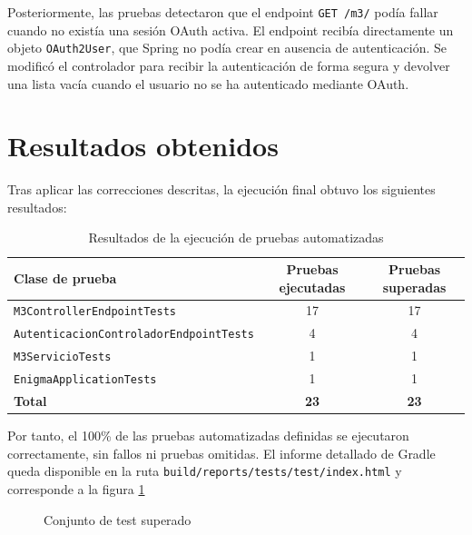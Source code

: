 Posteriormente, las pruebas detectaron que el endpoint \texttt{GET /m3/} podía fallar cuando no existía una sesión OAuth activa. El endpoint recibía directamente un objeto \texttt{OAuth2User}, que Spring no podía crear en ausencia de autenticación. Se modificó el controlador para recibir la autenticación de forma segura y devolver una lista vacía cuando el usuario no se ha autenticado mediante OAuth.

\section{Resultados obtenidos}

Tras aplicar las correcciones descritas, la ejecución final obtuvo los siguientes resultados:

\begin{table}[htbp]
	\centering
	\hspace*{-2cm}
	\begin{tabular}{|l|c|c|}
		\hline
		\textbf{Clase de prueba} & \textbf{Pruebas ejecutadas} & \textbf{Pruebas superadas} \\
		\hline
		\texttt{M3ControllerEndpointTests} & 17 & 17 \\
		\hline
		\texttt{AutenticacionControladorEndpointTests} & 4 & 4 \\
		\hline
		\texttt{M3ServicioTests} & 1 & 1 \\
		\hline
		\texttt{EnigmaApplicationTests} & 1 & 1 \\
		\hline
		\textbf{Total} & \textbf{23} & \textbf{23} \\
		\hline
	\end{tabular}
	\caption{Resultados de la ejecución de pruebas automatizadas}
	\label{tabla_resultados_pruebas}
\end{table}

Por tanto, el 100\% de las pruebas automatizadas definidas se ejecutaron correctamente, sin fallos ni pruebas omitidas. El informe detallado de Gradle queda disponible en la ruta \texttt{build/reports/tests/test/index.html} y corresponde a la figura \ref{test_superado}

\begin{figure}[htbp]
	\centerline{}
	\caption{Conjunto de test superado}
	\label{test_superado}
\end{figure}